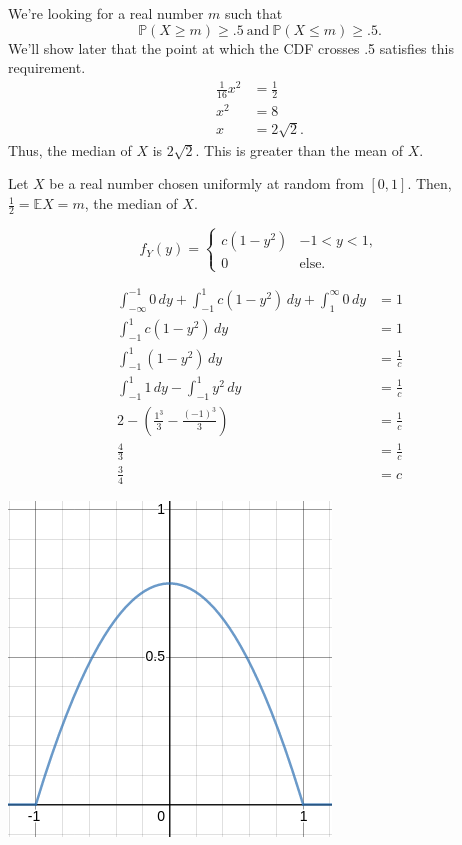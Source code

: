 \documentclass[12pt]{article}
\begin{document}
\medskip
{} We're looking for a real number $m$ such that
$$\mathbb P(X \geq m) \geq .5~\text{and}~\mathbb P(X \leq m) \geq .5.$$
We'll show later that the point at which the CDF crosses .5 satisfies this requirement.
\begin{align*}
    \frac1{16} x^2 &= \frac12 \\
    x^2 &= 8 \\
    x &= 2\sqrt2.
\end{align*}
Thus, the median of $X$ is $2\sqrt2$. This is greater than the mean of $X$.

\medskip
{} Let $X$ be a real number chosen uniformly at random from $[0,1]$. Then, $\frac12 = \mathbb EX = m$, the median of $X$.

\newpage
{}
    $$f_Y(y) = \begin{cases}c(1-y^2) & -1 < y < 1, \\ 0 & \text{else.} \end{cases}$$

\begin{align*}
    \int_{-\infty}^{-1} 0\,dy + \int_{-1}^1 c(1-y^2) \, dy + \int_1^\infty 0\,dy &= 1 \\
    \int_{-1}^1 c(1-y^2) \, dy &= 1 \\
    \int_{-1}^1 (1-y^2) \, dy &=\frac1c \\
    \int_{-1}^1 1\,dy - \int_{-1}^1 y^2 \,dy &= \frac1c \\
    2 - (\frac{1^3}3 - \frac{(-1)^3}3) &= \frac1c \\
    \frac43 &= \frac1c \\
    \frac34 &= c
\end{align*}

\medskip
{}
    \begin{center}\includegraphics{capture3.png}\end{center}
    
\end{document}

